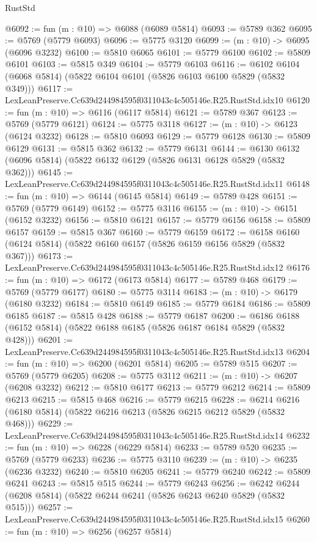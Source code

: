 \begin{lexlean}{RustStd}
\begin{coremodule}
@6092 := fun (m : @10) => @6088 (@6089 @5814)
@6093 := @5789 @362
@6095 := @5769 (@5779 @6093)
@6096 := @5775 @3120
@6099 := (m : @10) -> @6095 (@6096 @3232)
@6100 := @5810 @6065
@6101 := @5779 @6100
@6102 := @5809 @6101
@6103 := @5815 @349
@6104 := @5779 @6103
@6116 := @6102 @6104 (@6068 @5814) (@5822 @6104 @6101 (@5826 @6103 @6100 @5829 (@5832 @349)))
@6117 := LexLeanPreserve.Cc639d244984595f0311043c4c505146e.R25.RustStd.idx10
@6120 := fun (m : @10) => @6116 (@6117 @5814)
@6121 := @5789 @367
@6123 := @5769 (@5779 @6121)
@6124 := @5775 @3118
@6127 := (m : @10) -> @6123 (@6124 @3232)
@6128 := @5810 @6093
@6129 := @5779 @6128
@6130 := @5809 @6129
@6131 := @5815 @362
@6132 := @5779 @6131
@6144 := @6130 @6132 (@6096 @5814) (@5822 @6132 @6129 (@5826 @6131 @6128 @5829 (@5832 @362)))
@6145 := LexLeanPreserve.Cc639d244984595f0311043c4c505146e.R25.RustStd.idx11
@6148 := fun (m : @10) => @6144 (@6145 @5814)
@6149 := @5789 @428
@6151 := @5769 (@5779 @6149)
@6152 := @5775 @3116
@6155 := (m : @10) -> @6151 (@6152 @3232)
@6156 := @5810 @6121
@6157 := @5779 @6156
@6158 := @5809 @6157
@6159 := @5815 @367
@6160 := @5779 @6159
@6172 := @6158 @6160 (@6124 @5814) (@5822 @6160 @6157 (@5826 @6159 @6156 @5829 (@5832 @367)))
@6173 := LexLeanPreserve.Cc639d244984595f0311043c4c505146e.R25.RustStd.idx12
@6176 := fun (m : @10) => @6172 (@6173 @5814)
@6177 := @5789 @468
@6179 := @5769 (@5779 @6177)
@6180 := @5775 @3114
@6183 := (m : @10) -> @6179 (@6180 @3232)
@6184 := @5810 @6149
@6185 := @5779 @6184
@6186 := @5809 @6185
@6187 := @5815 @428
@6188 := @5779 @6187
@6200 := @6186 @6188 (@6152 @5814) (@5822 @6188 @6185 (@5826 @6187 @6184 @5829 (@5832 @428)))
@6201 := LexLeanPreserve.Cc639d244984595f0311043c4c505146e.R25.RustStd.idx13
@6204 := fun (m : @10) => @6200 (@6201 @5814)
@6205 := @5789 @515
@6207 := @5769 (@5779 @6205)
@6208 := @5775 @3112
@6211 := (m : @10) -> @6207 (@6208 @3232)
@6212 := @5810 @6177
@6213 := @5779 @6212
@6214 := @5809 @6213
@6215 := @5815 @468
@6216 := @5779 @6215
@6228 := @6214 @6216 (@6180 @5814) (@5822 @6216 @6213 (@5826 @6215 @6212 @5829 (@5832 @468)))
@6229 := LexLeanPreserve.Cc639d244984595f0311043c4c505146e.R25.RustStd.idx14
@6232 := fun (m : @10) => @6228 (@6229 @5814)
@6233 := @5789 @520
@6235 := @5769 (@5779 @6233)
@6236 := @5775 @3110
@6239 := (m : @10) -> @6235 (@6236 @3232)
@6240 := @5810 @6205
@6241 := @5779 @6240
@6242 := @5809 @6241
@6243 := @5815 @515
@6244 := @5779 @6243
@6256 := @6242 @6244 (@6208 @5814) (@5822 @6244 @6241 (@5826 @6243 @6240 @5829 (@5832 @515)))
@6257 := LexLeanPreserve.Cc639d244984595f0311043c4c505146e.R25.RustStd.idx15
@6260 := fun (m : @10) => @6256 (@6257 @5814)

\end{coremodule}
\end{lexlean}
